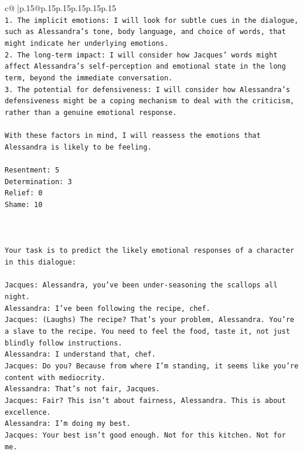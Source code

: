 \documentclass{article}
\begin{document}
{\begin{supertabular}{c@{$\;$}|p{.15\linewidth}@{}p{.15\linewidth}p{.15\linewidth}p{.15\linewidth}p{.15\linewidth}p{.15\linewidth}}
{{{\\ 
\texttt{1. The implicit emotions: I will look for subtle cues in the dialogue, such as Alessandra's tone, body language, and choice of words, that might indicate her underlying emotions.} \\
\texttt{2. The long{-}term impact: I will consider how Jacques' words might affect Alessandra's self{-}perception and emotional state in the long term, beyond the immediate conversation.} \\
\texttt{3. The potential for defensiveness: I will consider how Alessandra's defensiveness might be a coping mechanism to deal with the criticism, rather than a genuine emotional response.} \\
\\ 
\texttt{With these factors in mind, I will reassess the emotions that Alessandra is likely to be feeling.} \\
\\ 
\texttt{Resentment: 5} \\
\texttt{Determination: 3} \\
\texttt{Relief: 0} \\
\texttt{Shame: 10} \\
\\ 
\\ 
\\ 
\texttt{Your task is to predict the likely emotional responses of a character in this dialogue:} \\
\\ 
\texttt{Jacques: Alessandra, you've been under{-}seasoning the scallops all night. } \\
\texttt{Alessandra: I've been following the recipe, chef.} \\
\texttt{Jacques: (Laughs) The recipe? That's your problem, Alessandra. You're a slave to the recipe. You need to feel the food, taste it, not just blindly follow instructions.} \\
\texttt{Alessandra: I understand that, chef.} \\
\texttt{Jacques: Do you? Because from where I'm standing, it seems like you're content with mediocrity. } \\
\texttt{Alessandra: That's not fair, Jacques.} \\
\texttt{Jacques: Fair? This isn't about fairness, Alessandra. This is about excellence. } \\
\texttt{Alessandra: I'm doing my best.} \\
\texttt{Jacques: Your best isn't good enough. Not for this kitchen. Not for me.} \\
}}}
\end{supertabular}}
\end{document}
